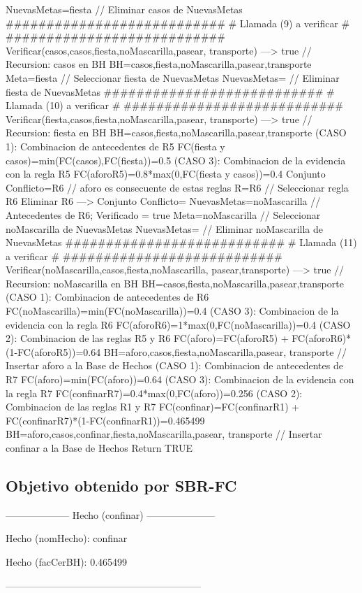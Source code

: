 \begin{listing}[language=Pascal]
	NuevasMetas={fiesta} // Eliminar casos de NuevasMetas
  ###########################
  # Llamada (9) a verificar #
  ###########################
	Verificar(casos,{casos,fiesta,noMascarilla,pasear,
	transporte}) ---> true // Recursion: casos en BH
	BH={casos,fiesta,noMascarilla,pasear,transporte}
	Meta=fiesta // Seleccionar fiesta de NuevasMetas
	NuevasMetas={} // Eliminar fiesta de NuevasMetas
  ###########################
  # Llamada (10) a verificar #
  ###########################
	Verificar(fiesta,{casos,fiesta,noMascarilla,pasear,
	transporte}) ---> true // Recursion: fiesta en BH
	BH={casos,fiesta,noMascarilla,pasear,transporte}
	(CASO 1): Combinacion de antecedentes de R5
	 FC(fiesta y casos)=min(FC(casos),FC(fiesta))=0.5
	(CASO 3): Combinacion de la evidencia con la regla R5
	 FC(aforo{R5})=0.8*max(0,FC(fiesta y casos))=0.4
	Conjunto Conflicto={R6} // aforo es consecuente de estas reglas
	R={R6} // Seleccionar regla R6
	Eliminar R6 ---> Conjunto Conflicto={}
	NuevasMetas={noMascarilla} // Antecedentes de R6; Verificado = true
	Meta=noMascarilla // Seleccionar noMascarilla de NuevasMetas
	NuevasMetas={} // Eliminar noMascarilla de NuevasMetas
  ###########################
  # Llamada (11) a verificar #
  ###########################
	Verificar(noMascarilla,{casos,fiesta,noMascarilla,
	pasear,transporte}) ---> true // Recursion: noMascarilla en BH
	BH={casos,fiesta,noMascarilla,pasear,transporte}
	(CASO 1): Combinacion de antecedentes de R6
	 FC(noMascarilla)=min(FC(noMascarilla))=0.4
	(CASO 3): Combinacion de la evidencia con la regla R6
	 FC(aforo{R6})=1*max(0,FC(noMascarilla))=0.4
	(CASO 2): Combinacion de las reglas R5 y R6
	 FC(aforo)=FC(aforo{R5}) + FC(aforo{R6})*(1-FC(aforo{R5}))=0.64
	BH={aforo,casos,fiesta,noMascarilla,pasear,
	transporte} // Insertar aforo a la Base de Hechos
	(CASO 1): Combinacion de antecedentes de R7
	 FC(aforo)=min(FC(aforo))=0.64
	(CASO 3): Combinacion de la evidencia con la regla R7
	 FC(confinar{R7})=0.4*max(0,FC(aforo))=0.256
	(CASO 2): Combinacion de las reglas R1 y R7
	 FC(confinar)=FC(confinar{R1}) + FC(confinar{R7})*(1-FC(confinar{R1}))=0.465499
	BH={aforo,casos,confinar,fiesta,noMascarilla,pasear,
	transporte} // Insertar confinar a la Base de Hechos
Return TRUE
\end{listing}
\subsection{Objetivo obtenido por SBR-FC}
\begin{center}
\par -------------------- Hecho (confinar) ---------------------
\par Hecho (nomHecho): confinar
\par Hecho (facCerBH): 0.465499
\par ------------------------------------------------------------
\end{center}
